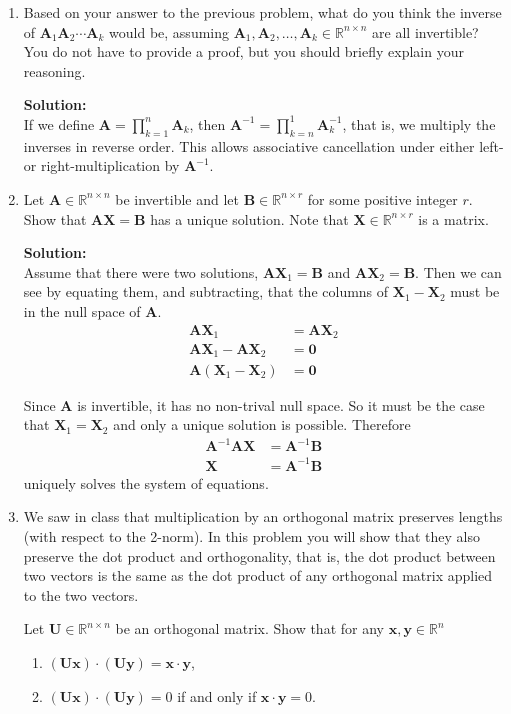 \documentclass[]{article}
\newcommand{\R}{\mathbb{R}}				%
\newcommand{\x}{\bm{x}}					%
\newcommand{\y}{\bm{y}}					%
\newcommand{\A}{\bm{A}}					%
\newcommand{\solution}{\vskip 0.5cm \textbf{\large Solution:} \\}
\begin{document}
\begin{enumerate}
	\item Based on your answer to the previous problem, what do you think the inverse of $\A_1\A_2\cdots \A_k$ would be, assuming $\A_1,\A_2,\dots,\A_k\in\R^{n\times n}$ are all invertible? You do not have to provide a proof, but you should briefly explain your reasoning.

	  \solution

      If we define $\A = \prod_{k=1}^{n} \A_k$, then $\A^{-1} =
      \prod_{k=n}^{1} \A_k^{-1}$, that is, we multiply the inverses in
      reverse order. This allows associative cancellation under either
      left- or right-multiplication by $\A^{-1}$.


	\item Let $\A\in\R^{n\times n}$ be invertible and let $\bm{B}\in\R^{n\times r}$ for some positive integer $r$. Show that $\bm{AX}=\bm{B}$ has a unique solution. Note that $\bm{X}\in\R^{n\times r}$ is a matrix.

	  \solution Assume that there were two solutions, $\A\bm{X}_1 =
      \bm{B}$ and $\A\bm{X}_2 = \bm{B}$. Then we can see by equating
      them, and subtracting, that the columns of $\bm{X}_1 - \bm{X}_2$
      must be in the null space of $\A$.
      \[
      \begin{split}
        \A\bm{X}_1 & = \A\bm{X}_2 \\
        \A\bm{X}_1 - \A\bm{X}_2 &= \bm{0}\\
        \A(\bm{X}_1 - \bm{X}_2) &= \bm{0}
      \end{split}
      \]
      
      Since $\A$ is invertible, it has no non-trival null space. So it
      must be the case that $\bm{X}_1 = \bm{X}_2$ and only a
      unique solution is possible. Therefore
      \[
      \begin{split}
        \A^{-1}\A\bm{X} &= \A^{-1}\bm{B} \\
        \bm{X} &= \A^{-1}\bm{B}
      \end{split}
      \]
      uniquely solves the system of equations.


	\item We saw in class that multiplication by an orthogonal matrix
      preserves lengths (with respect to the 2-norm). In this problem
      you will show that they also preserve the dot product and
      orthogonality, that is, the dot product between two vectors is
      the same as the dot product of any orthogonal matrix applied to
      the two vectors.

	  Let $\bm{U}\in\R^{n\times n}$ be an orthogonal matrix. Show that for any $\x,\y\in\R^n$
	  \begin{enumerate}
	  \item $(\bm{Ux})\cdot(\bm{Uy})=\x\cdot\y$,
	  \item $(\bm{Ux})\cdot(\bm{Uy}) = 0$ if and only if $\x\cdot \y=0$.


\end{enumerate}
\end{enumerate}
\end{document}
